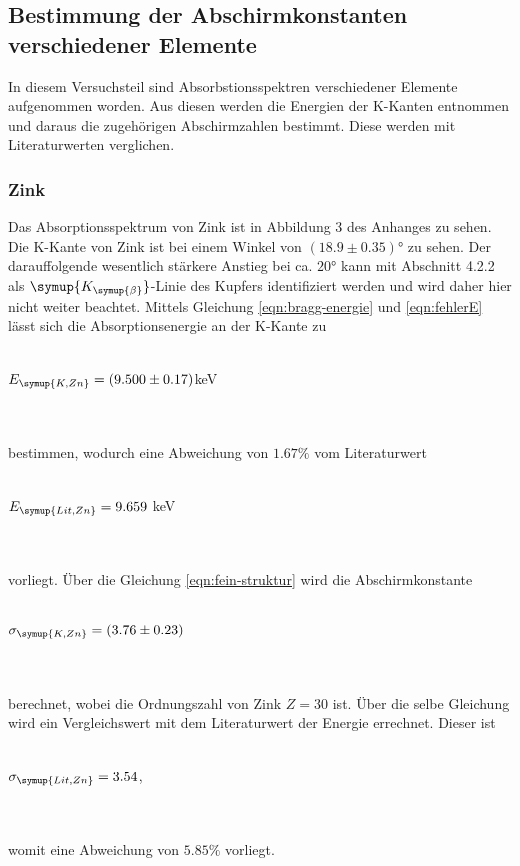 \subsection{Bestimmung der Abschirmkonstanten verschiedener Elemente} 
\label{sec:bah}
    In diesem Versuchsteil sind Absorbstionsspektren verschiedener Elemente aufgenommen worden. Aus diesen werden die Energien der 
    K-Kanten entnommen und daraus die zugehörigen Abschirmzahlen bestimmt. Diese werden mit Literaturwerten verglichen.
        
        \subsubsection{Zink}
            Das Absorptionsspektrum von Zink ist in Abbildung 3 des Anhanges zu sehen.
            Die K-Kante von Zink ist bei einem Winkel von $(18.9 \pm 0.35)°$ zu sehen. Der darauffolgende
            wesentlich stärkere Anstieg bei ca. $20°$ kann mit Abschnitt 4.2.2 als 
            $\symup{K_{\symup{\beta}}}$-Linie des Kupfers identifiziert werden und wird
            daher hier nicht weiter beachtet. Mittels Gleichung \eqref{eqn:bragg-energie} und \eqref{eqn:fehlerE} lässt sich
            die Absorptionsenergie an der K-Kante zu 
            \\ \\
            \centerline{$E_{\symup{K, Zn}} = (9.500 \pm 0.17)$keV}
            \\ \\
            bestimmen, wodurch eine Abweichung von $1.67 \%$ vom Literaturwert
            \\ \\
            \centerline{$E_{\symup{Lit, Zn}} = 9.659$ keV \cite{periodic}}
            \\ \\
            vorliegt. Über die Gleichung \eqref{eqn:fein-struktur} wird die Abschirmkonstante 
            \\ \\
            \centerline{$\sigma_{\symup{K, Zn}} = (3.76 \pm 0.23)$}
            \\ \\
            berechnet, wobei die Ordnungszahl von Zink $Z = 30$ ist.
            Über die selbe Gleichung wird ein Vergleichswert mit dem Literaturwert der Energie 
            errechnet. Dieser ist
            \\ \\
            \centerline{$\sigma_{\symup{Lit, Zn}} = 3.54$,}
            \\ \\
            womit eine Abweichung von $5.85 \%$ vorliegt.
